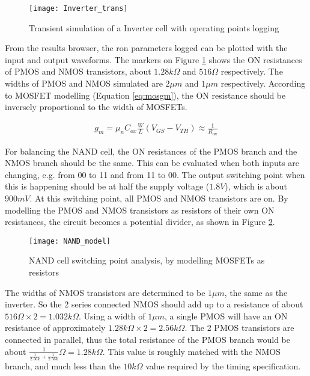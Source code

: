 \begin{figure}[!htb]
	\centering
	\texttt{[image: Inverter\_trans]}
	\caption{Transient simulation of a Inverter cell with operating points logging}
	\label{fig:inv_trans}
\end{figure}

From the results browser, the ron parameters logged can be plotted with the input and output waveforms. The markers on Figure \ref{fig:inv_trans} shows the ON resistances of PMOS and NMOS transistors, about $1.28 k \Omega$ and $516 \Omega$ respectively. The widths of PMOS and NMOS simulated are $2 \mu m$ and $1 \mu m$ respectively. According to MOSFET modelling (Equation \ref{eq:mosgm}), the ON resistance should be inversely proportional to the width of MOSFETs.

\begin{align}
	g_m = \mu_n C_{ox} \frac{W}{L} (V_{GS} - V_{TH}) \approx \frac{1}{R_{on}}
	\label{eq:mosgm}
\end{align}

For balancing the NAND cell, the ON resistances of the PMOS branch and the NMOS branch should be the same. This can be evaluated when both inputs are changing, e.g. from 00 to 11 and from 11 to 00. The output switching point when this is happening should be at half the supply voltage ($1.8 V$), which is about $900 mV$. At this switching point, all PMOS and NMOS transistors are on. By modelling the PMOS and NMOS transistors as resistors of their own ON resistances, the circuit becomes a potential divider, as shown in Figure \ref{fig:nand_model}.

\begin{figure}[!htb]
	\centering
	\texttt{[image: NAND\_model]}
	\caption{NAND cell switching point analysis, by modelling MOSFETs as resistors}
	\label{fig:nand_model}
\end{figure}

The widths of NMOS transistors are determined to be $1 \mu m$, the same as the inverter. So the 2 series connected NMOS should add up to a resistance of about $516 \Omega \times 2 = 1.032 k \Omega$. Using a width of $1 \mu m$, a single PMOS will have an ON resistance of approximately $1.28 k \Omega \times 2 = 2.56 k \Omega$. The 2 PMOS transistors are connected in parallel, thus the total resistance of the PMOS branch would be about $\frac{1}{\frac{1}{2.56 k} + \frac{1}{2.56 k}} \Omega = 1.28 k \Omega$. This value is roughly matched with the NMOS branch, and much less than the $10 k \Omega$ value required by the timing specification.

